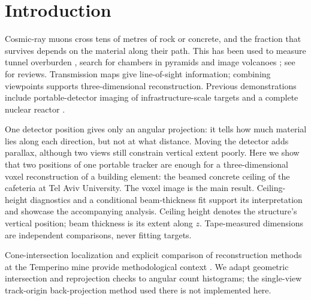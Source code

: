 \section{Introduction}\label{sec:intro}
Cosmic-ray muons cross tens of metres of rock or concrete, and the fraction that survives depends on the material along their path. This has been used to measure tunnel overburden \citep{george1955}, search for chambers in pyramids \citep{alvarez1970,morishima2017} and image volcanoes \citep{tanaka2007}; see \citep{procureur2018,bonechi2020} for reviews. Transmission maps give line-of-sight information; combining viewpoints supports three-dimensional reconstruction. Previous demonstrations include portable-detector imaging of infrastructure-scale targets and a complete nuclear reactor \citep{chaiwongkhot2021,procureur2023}.

One detector position gives only an angular projection: it tells how much material lies along each direction, but not at what distance. Moving the detector adds parallax, although two views still constrain vertical extent poorly. Here we show that two positions of one portable tracker are enough for a three-dimensional voxel reconstruction of a building element: the beamed concrete ceiling of the cafeteria at Tel Aviv University. The voxel image is the main result. Ceiling-height diagnostics and a conditional beam-thickness fit support its interpretation and showcase the accompanying analysis. Ceiling height denotes the structure's vertical position; beam thickness is its extent along $z$. Tape-measured dimensions are independent comparisons, never fitting targets.

Cone-intersection localization and explicit comparison of reconstruction methods at the Temperino mine provide methodological context \citep{borselli2022}. We adapt geometric intersection and reprojection checks to angular count histograms; the single-view track-origin back-projection method used there is not implemented here.
